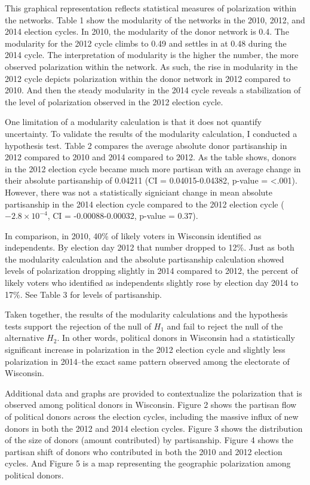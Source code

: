 \documentclass[12pt,]{article}
\begin{document}
This graphical representation reflects statistical measures of
polarization within the networks. Table 1 show the modularity of the
networks in the 2010, 2012, and 2014 election cycles. In 2010, the
modularity of the donor network is 0.4. The modularity for the 2012
cycle climbs to 0.49 and settles in at 0.48 during the 2014 cycle. The
interpretation of modularity is the higher the number, the more observed
polarization within the network. As such, the rise in modularity in the
2012 cycle depicts polarization within the donor network in 2012
compared to 2010. And then the steady modularity in the 2014 cycle
reveals a stabilization of the level of polarization observed in the
2012 election cycle.

One limitation of a modularity calculation is that it does not quantify
uncertainty. To validate the results of the modularity calculation, I
conducted a hypothesis test. Table 2 compares the average absolute donor
partisanship in 2012 compared to 2010 and 2014 compared to 2012. As the
table shows, donors in the 2012 election cycle became much more partisan
with an average change in their absolute partisanship of 0.04211 (CI =
0.04015-0.04382, p-value = \textless.001). However, there was not a
statistically signiciant change in mean absolute partisanship in the
2014 election cycle compared to the 2012 election cycle
(\ensuremath{-2.8\times 10^{-4}}, CI = -0.00088-0.00032, p-value =
0.37).

In comparison, in 2010, 40\% of likely voters in Wisconsin identified as
independents. By election day 2012 that number dropped to 12\%. Just as
both the modularity calculation and the absolute partisanship
calculation showed levels of polarization dropping slightly in 2014
compared to 2012, the percent of likely voters who identified as
independents slightly rose by election day 2014 to 17\%. See Table 3 for
levels of partisanship.

Taken together, the results of the modularity calculations and the
hypothesis tests support the rejection of the null of \(H_{1}\) and fail
to reject the null of the alternative \(H_{2}\). In other words,
political donors in Wisconsin had a statistically significant increase
in polarization in the 2012 election cycle and slightly less
polarization in 2014--the exact same pattern observed among the
electorate of Wisconsin.

Additional data and graphs are provided to contextualize the
polarization that is observed among political donors in Wisconsin.
Figure 2 shows the partisan flow of political donors across the election
cycles, including the massive influx of new donors in both the 2012 and
2014 election cycles. Figure 3 shows the distribution of the size of
donors (amount contributed) by partisanship. Figure 4 shows the partisan
shift of donors who contributed in both the 2010 and 2012 election
cycles. And Figure 5 is a map representing the geographic polarization
among political donors.
\end{document}

